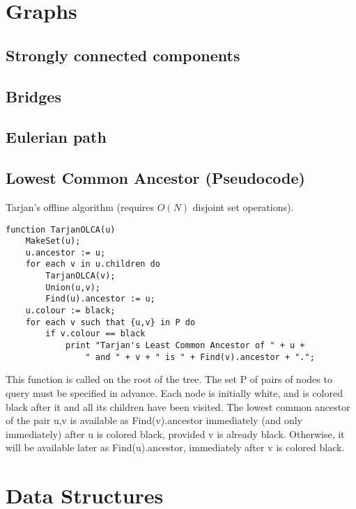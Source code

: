 \documentclass[10pt]{extarticle}
\begin{document}
\begin{multicols*}{3}
\section{Graphs}

\subsection{Strongly connected components} %


\subsection{Bridges} %


\subsection{Eulerian path} %


\subsection{Lowest Common Ancestor (Pseudocode)} %
Tarjan's offline algorithm (requires $O(N)$ disjoint set operations).
\begin{lstlisting}
function TarjanOLCA(u)
    MakeSet(u);
    u.ancestor := u;
    for each v in u.children do
        TarjanOLCA(v);
        Union(u,v);
        Find(u).ancestor := u;
    u.colour := black;
    for each v such that {u,v} in P do
        if v.colour == black
            print "Tarjan's Least Common Ancestor of " + u +
                " and " + v + " is " + Find(v).ancestor + ".";
\end{lstlisting}
This function is called on the root of the tree. The set P of pairs of nodes to
query must be specified in advance. Each node is initially white, and is
colored black after it and all its children have been visited. The lowest
common ancestor of the pair {u,v} is available as Find(v).ancestor immediately
(and only immediately) after u is colored black, provided v is already black.
Otherwise, it will be available later as Find(u).ancestor, immediately after v
is colored black.

\section{Data Structures}


\end{multicols*}
\end{document}
